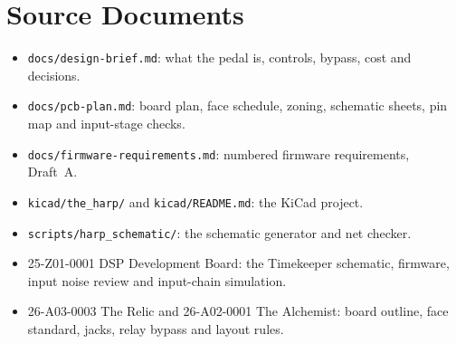 \section{Source Documents}
\begin{itemize}
  \item \texttt{docs/design-brief.md}: what the pedal is, controls, bypass, cost and decisions.
  \item \texttt{docs/pcb-plan.md}: board plan, face schedule, zoning, schematic sheets, pin map and input-stage checks.
  \item \texttt{docs/firmware-requirements.md}: numbered firmware requirements, Draft~A.
  \item \texttt{kicad/the\_harp/} and \texttt{kicad/README.md}: the KiCad project.
  \item \texttt{scripts/harp\_schematic/}: the schematic generator and net checker.
  \item 25-Z01-0001 DSP Development Board: the Timekeeper schematic, firmware, input noise review and input-chain simulation.
  \item 26-A03-0003 The Relic and 26-A02-0001 The Alchemist: board outline, face standard, jacks, relay bypass and layout rules.
\end{itemize}
